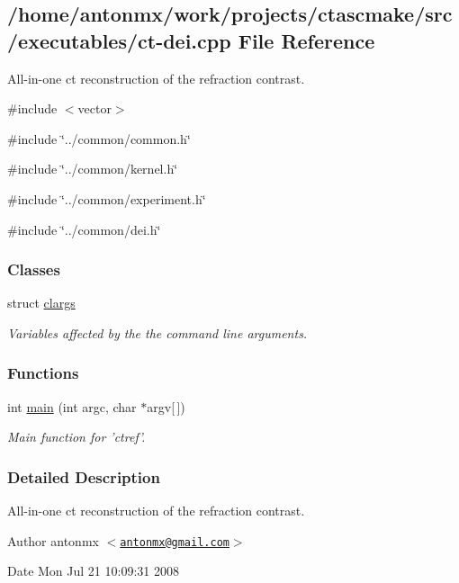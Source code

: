 \hypertarget{ct-dei_8cpp}{
\subsection{/home/antonmx/work/projects/ctascmake/src/executables/ct-\/dei.cpp File Reference}
\label{ct-dei_8cpp}
}


All-\/in-\/one ct reconstruction of the refraction contrast.  


{\ttfamily \#include $<$vector$>$}\par
{\ttfamily \#include \char`\"{}../common/common.h\char`\"{}}\par
{\ttfamily \#include \char`\"{}../common/kernel.h\char`\"{}}\par
{\ttfamily \#include \char`\"{}../common/experiment.h\char`\"{}}\par
{\ttfamily \#include \char`\"{}../common/dei.h\char`\"{}}\par
\subsubsection*{Classes}
\begin{DoxyCompactItemize}
\item 
struct \hyperlink{structclargs}{clargs}
\begin{DoxyCompactList}\small\item\em Variables affected by the the command line arguments. \item\end{DoxyCompactList}\end{DoxyCompactItemize}
\subsubsection*{Functions}
\begin{DoxyCompactItemize}
\item 
int \hyperlink{ct-dei_8cpp_a0ddf1224851353fc92bfbff6f499fa97}{main} (int argc, char $\ast$argv\mbox{[}$\,$\mbox{]})
\begin{DoxyCompactList}\small\item\em Main function for 'ctref'. \item\end{DoxyCompactList}\end{DoxyCompactItemize}


\subsubsection{Detailed Description}
All-\/in-\/one ct reconstruction of the refraction contrast. \begin{DoxyAuthor}{Author}
antonmx $<$\href{mailto:antonmx@gmail.com}{\tt antonmx@gmail.com}$>$ 
\end{DoxyAuthor}
\begin{DoxyDate}{Date}
Mon Jul 21 10:09:31 2008 
\end{DoxyDate}


